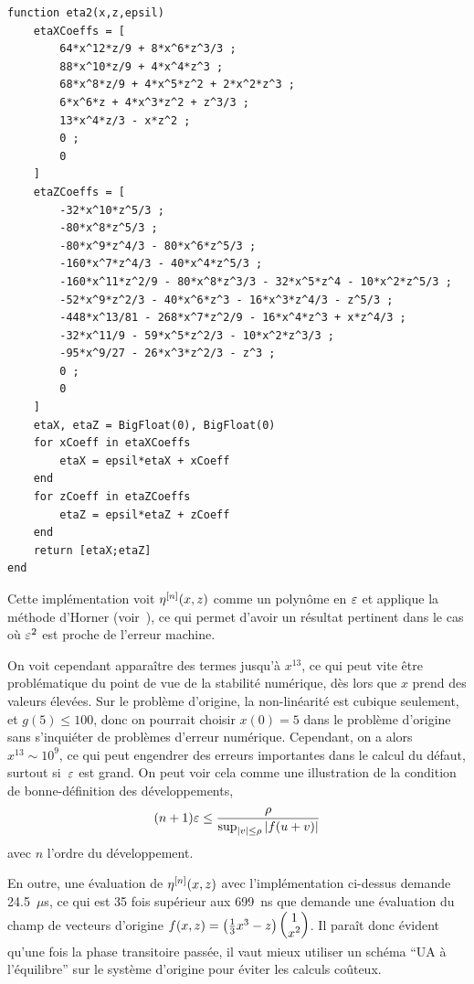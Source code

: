 \begin{lstlisting}
function eta2(x,z,epsil)
    etaXCoeffs = [
        64*x^12*z/9 + 8*x^6*z^3/3 ;
        88*x^10*z/9 + 4*x^4*z^3 ;
        68*x^8*z/9 + 4*x^5*z^2 + 2*x^2*z^3 ;
        6*x^6*z + 4*x^3*z^2 + z^3/3 ;
        13*x^4*z/3 - x*z^2 ;
        0 ;
        0
    ]
    etaZCoeffs = [
        -32*x^10*z^5/3 ;
        -80*x^8*z^5/3 ;
        -80*x^9*z^4/3 - 80*x^6*z^5/3 ;
        -160*x^7*z^4/3 - 40*x^4*z^5/3 ;
        -160*x^11*z^2/9 - 80*x^8*z^3/3 - 32*x^5*z^4 - 10*x^2*z^5/3 ;
        -52*x^9*z^2/3 - 40*x^6*z^3 - 16*x^3*z^4/3 - z^5/3 ;
        -448*x^13/81 - 268*x^7*z^2/9 - 16*x^4*z^3 + x*z^4/3 ;
        -32*x^11/9 - 59*x^5*z^2/3 - 10*x^2*z^3/3 ;
        -95*x^9/27 - 26*x^3*z^2/3 - z^3 ;
        0 ;
        0
    ]
    etaX, etaZ = BigFloat(0), BigFloat(0)
    for xCoeff in etaXCoeffs
        etaX = epsil*etaX + xCoeff
    end
    for zCoeff in etaZCoeffs
        etaZ = epsil*etaZ + zCoeff
    end
    return [etaX;etaZ]
end
\end{lstlisting}
%
Cette implémentation voit $\eta^{[n]}(x,z)$ comme un polynôme en $\varepsilon$ et applique la méthode d'Horner (voir~\cite[Sec.~4.6.4]{knuth.2014.art}), ce qui permet d'avoir un résultat pertinent dans le cas où $\varepsilon^2$ est proche de l'erreur machine. 

On voit cependant apparaître des termes jusqu'à $x^{13}$, ce qui peut vite être problématique du point de vue de la stabilité numérique, dès lors que $x$ prend des valeurs élevées. Sur le problème d'origine, la non-linéarité est cubique seulement, et $g(5) \leq 100$, donc on pourrait choisir $x(0) = 5$ dans le problème d'origine sans s'inquiéter de problèmes d'erreur numérique. Cependant, on a alors $x^{13} \sim 10^9$, ce qui peut engendrer des erreurs importantes dans le calcul du défaut, surtout si~$\varepsilon$ est grand. On peut voir cela comme une illustration de la condition de bonne-définition des développements, 
\begin{equation*}
    (n+1) \varepsilon \leq \frac{\rho}{\sup_{|v| \leq \rho} |f(u+v)|}
\end{equation*}
avec $n$ l'ordre du développement. 

En outre, une évaluation de $\eta^{[n]} (x,z)$ avec l'implémentation ci-dessus demande 24.5~$\mu$s, ce qui est 35 fois supérieur aux 699~ns que demande une évaluation du champ de vecteurs d'origine $f(x,z) = \left(\frac{1}{3}x^3 - z \right) \begin{pmatrix} 1 \\ x^2 \end{pmatrix}$. Il paraît donc évident qu'une fois la phase transitoire passée, il vaut mieux utiliser un schéma \enquote{UA à l'équilibre} sur le système d'origine pour éviter les calculs coûteux.



